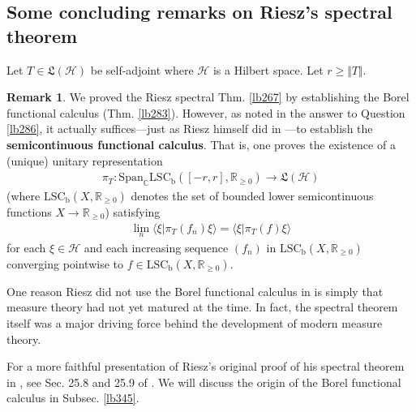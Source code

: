 \documentclass[12pt,b5paper,notitlepage]{article}
\theoremstyle{definition}
\newtheorem{rem}[df]{Remark}
\theoremstyle{plain}
\newcommand{\fk}{\mathfrak}
\newcommand{\Span}{\mathrm{Span}}
\newcommand{\bk}[1]{\langle {#1}\rangle}
\newcommand{\Cbb}{\mathbb C}
\newcommand{\Rbb}{\mathbb R}
\newcommand{\LSCb}{\mathrm{LSC}_{\mathrm b}}
\newcommand{\MH}{\mathcal H}
\newcommand{\hqed}{\hfill\qedsymbol}
\numberwithin{equation}{section}
\begin{document}
\subsection{Some concluding remarks on Riesz's spectral theorem}

Let $T\in\fk L(\MH)$ be self-adjoint where $\MH$ is a Hilbert space. Let $r\geq \Vert T\Vert$. 

\begin{rem}\label{lb287}
We proved the Riesz spectral Thm. \ref{lb267} by establishing the Borel functional calculus (Thm. \ref{lb283}). However, as noted in the answer to Question \ref{lb286}, it actually suffices---just as Riesz himself did in \cite{Rie13}---to establish the \textbf{semicontinuous functional calculus}.  That is, one proves the existence of a (unique) unitary representation
\begin{align*}
\pi_T:\Span_\Cbb\LSCb([-r,r],\Rbb_{\geq0})\rightarrow\fk L(\MH)
\end{align*}
(where $\LSCb(X,\Rbb_{\geq0})$ denotes the set of bounded lower semicontinuous functions $X\rightarrow\Rbb_{\geq0}$) satisfying
\begin{align*}
\lim_n\bk{\xi|\pi_T(f_n)\xi}=\bk{\xi|\pi_T(f)\xi}
\end{align*}
for each $\xi\in\MH$ and each increasing sequence $(f_n)$ in $\LSCb(X,\Rbb_{\geq0})$ converging pointwise to $f\in\LSCb(X,\Rbb_{\geq0})$.

One reason Riesz did not use the Borel functional calculus in \cite{Rie13} is simply that measure theory had not yet matured at the time. In fact, the spectral theorem itself was a major driving force behind the development of modern measure theory.

For a more faithful presentation of Riesz’s original proof of his spectral theorem in \cite{Rie13}, see Sec. 25.8 and 25.9 of \cite{Gui-A}. We will discuss the origin of the Borel functional calculus in Subsec. \ref{lb345}. \hqed
\end{rem}
\end{document}
